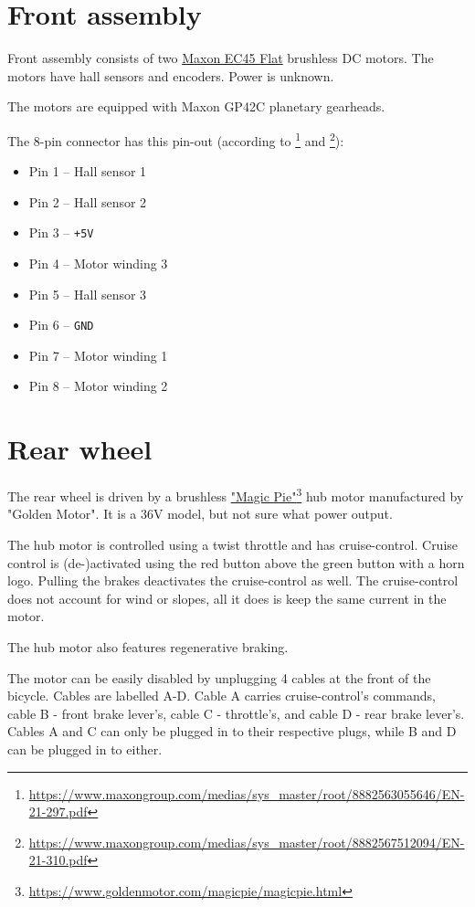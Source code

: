 \section{Front assembly}
Front assembly consists of two \href{https://www.maxongroup.com/maxon/view/category/motor?etcc_cu=onsite&etcc_med_onsite=Product&etcc_cmp_onsite=EC+flat+Program&etcc_plc=Overview-Page-Brushless-DC-Motors&etcc_var=%5bcom%5d%23en%23_d_&target=filter&filterCategory=ecflat}{Maxon EC45 Flat} brushless DC motors. The motors have hall sensors and encoders. Power is unknown.

The motors are equipped with Maxon GP42C planetary gearheads.

The 8-pin connector has this pin-out (according to \footnote{\href{https://www.maxongroup.com/medias/sys_master/root/8882563055646/EN-21-297.pdf}{https://www.maxongroup.com/medias/sys\_master/root/8882563055646/EN-21-297.pdf}} and \footnote{\href{https://www.maxongroup.com/medias/sys_master/root/8882567512094/EN-21-310.pdf}{https://www.maxongroup.com/medias/sys\_master/root/8882567512094/EN-21-310.pdf}}):
\begin{itemize}
  \item Pin 1 -- Hall sensor 1
  \item Pin 2 -- Hall sensor 2
  \item Pin 3 -- \verb|+5V|
  \item Pin 4 -- Motor winding 3
  \item Pin 5 -- Hall sensor 3
  \item Pin 6 -- \verb|GND|
  \item Pin 7 -- Motor winding 1
  \item Pin 8 -- Motor winding 2
\end{itemize}

\section{Rear wheel}
The rear wheel is driven by a brushless \href{https://www.goldenmotor.com/magicpie/magicpie.html}{"Magic Pie"}\footnote{\href{https://www.goldenmotor.com/magicpie/magicpie.html}{https://www.goldenmotor.com/magicpie/magicpie.html}} hub motor manufactured by "Golden Motor". It is a 36V model, but not sure what power output.

The hub motor is controlled using a twist throttle and has cruise-control. Cruise control is (de-)activated using the red button above the green button with a horn logo. Pulling the brakes deactivates the cruise-control as well. The cruise-control does not account for wind or slopes, all it does is keep the same current in the motor.

The hub motor also features regenerative braking.

The motor can be easily disabled by unplugging 4 cables at the front of the bicycle. Cables are labelled A-D. Cable A carries cruise-control's commands, cable B - front brake lever's, cable C - throttle's, and cable D - rear brake lever's. Cables A and C can only be plugged in to their respective plugs, while B and D can be plugged in to either.
